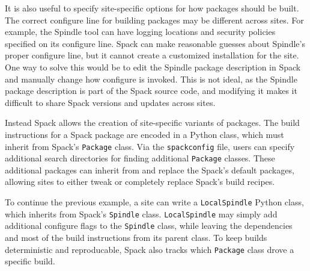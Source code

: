 It is also useful to specify site-specific options for how packages should be built.
The correct configure line for building packages may be different across sites.
For example, the Spindle tool can have logging locations and security policies specified on its configure line.
Spack can make reasonable guesses about Spindle's proper configure line,
but it cannot create a customized installation for the site.
One way to solve this would be to edit the Spindle package description
in Spack and manually change how configure is invoked.
This is not ideal, as the Spindle package description is part of the Spack source code,
and modifying it makes it difficult to share Spack versions and updates across sites.

Instead Spack allows the creation of site-specific variants of packages.
The build instructions for a Spack package are encoded in a Python class,
which must inherit from Spack's {\tt Package} class.
Via the {\tt spackconfig} file, users can specify additional search directories
for finding additional {\tt Package} classes.
These additional packages can inherit from and replace the Spack's default packages,
allowing sites to either tweak or completely replace Spack's build recipes.

To continue the previous example, a site can write a {\tt LocalSpindle} Python class,
which inherits from Spack's {\tt Spindle} class.
{\tt LocalSpindle} may simply add additional configure flags to the {\tt Spindle} class,
while leaving the dependencies and most of the build instructions from its parent class.
To keep builds deterministic and reproducable,
Spack also tracks which {\tt Package} class drove a specific build. 

